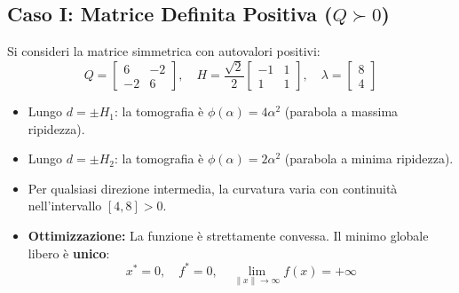 \subsection{Caso I: Matrice Definita Positiva (\texorpdfstring{$Q \succ 0$}{Q > 0})}
Si consideri la matrice simmetrica con autovalori positivi:
\begin{equation}
Q = \begin{bmatrix} 6 & -2 \\ -2 & 6 \end{bmatrix}, \quad H = \frac{\sqrt{2}}{2} \begin{bmatrix} -1 & 1 \\ 1 & 1 \end{bmatrix}, \quad \lambda = \begin{bmatrix} 8 \\ 4 \end{bmatrix}
\end{equation}
\begin{itemize}
    \item Lungo $d = \pm H_1$: la tomografia \`e $\phi(\alpha) = 4\alpha^2$ (parabola a massima ripidezza).
    \item Lungo $d = \pm H_2$: la tomografia \`e $\phi(\alpha) = 2\alpha^2$ (parabola a minima ripidezza).
    \item Per qualsiasi direzione intermedia, la curvatura varia con continuit\`a nell'intervallo $[4, 8] > 0$.
    \item \textbf{Ottimizzazione:} La funzione \`e strettamente convessa. Il minimo globale libero \`e \textbf{unico}:
    \begin{equation}
    x^* = 0, \quad f^* = 0, \quad \lim_{\|x\| \to \infty} f(x) = +\infty
    \end{equation}
\end{itemize}

